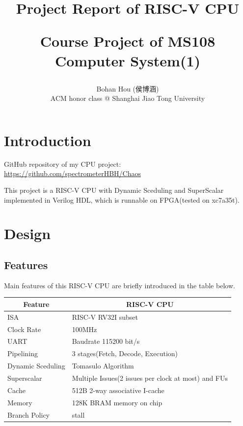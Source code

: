 \documentclass[12pt, a4paper]{article}
\title{Project Report of RISC-V CPU\\\begin{large}Course Project of MS108 Computer System(1)\end{large}}
\author{Bohan Hou (侯博涵)\\ACM honor class @ Shanghai Jiao Tong University}
\date{}
\theoremstyle{margin}
\begin{document}
\maketitle

\section{Introduction}

GitHub repository of my CPU project: \url{https://github.com/spectrometerHBH/Chaos}

This project is a RISC-V CPU with Dynamic Sceduling and SuperScalar implemented in Verilog HDL, which is runnable on FPGA(tested on xc7a35t).

\section{Design}

\subsection{Features}

Main features of this RISC-V CPU are briefly introduced in the table below.

\begin{table}[H]
\centering
\begin{tabular}{@{}ll@{}}
\toprule
\multicolumn{1}{c}{Feature} & \multicolumn{1}{c}{RISC-V CPU}                                                                        \\ \midrule
ISA                         & RISC-V RV32I subset\\
Clock Rate                  & 100MHz \\
UART                        & Baudrate 115200 bit/s \\
Pipelining                  & 3 stages(Fetch, Decode, Execution) \\
Dynamic Sceduling           & Tomasulo Algorithm \\
Superscalar                 & Multiple Issues(2 issues per clock at most) and FUs \\
Cache                       & 512B 2-way associative I-cache\\
Memory                      & 128K BRAM memory on chip \\ 
Branch Policy               & stall \\
\bottomrule
\end{tabular}
\end{table}
\end{document}
